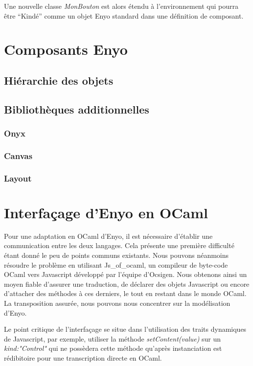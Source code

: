 \documentclass[11pt,a4paper]{report}
\begin{document}
Une nouvelle classe \emph{MonBouton} est alors étendu à l'environnement qui pourra être
``Kindé'' comme un objet Enyo standard dans une définition de composant.


\chapter{Composants Enyo}
\section{Hiérarchie des objets}
\section{Bibliothèques additionnelles}
\subsection{Onyx}
\subsection{Canvas}
\subsection{Layout}


\chapter{Interfaçage d'Enyo en OCaml}

Pour une adaptation en OCaml d'Enyo, il est nécessaire d'établir une communication
entre les deux langages. Cela présente une première difficulté étant donné le peu
de points communs existants. Nous pouvons néanmoins résoudre le problème en
utilisant  Js\_of\_ocaml, un compileur de byte-code OCaml vers Javascript développé par 
l'équipe d'Ocsigen. Nous obtenons ainsi un moyen fiable d'assurer une traduction, 
de déclarer des objets Javascript ou encore d'attacher des méthodes à ces derniers, le tout
en restant dans le monde OCaml. La transposition assurée, nous pouvons nous concentrer sur 
la modélisation d'Enyo.

Le point critique de l'interfaçage se situe dans l'utilisation des traits 
dynamiques de Javascript, par exemple, utiliser la méthode \emph{setContent(value)} sur un
\emph{kind:"Control"} qui ne possèdera cette méthode qu'après instanciation est
rédibitoire pour une transcription directe en OCaml.\medskip
\end{document}
